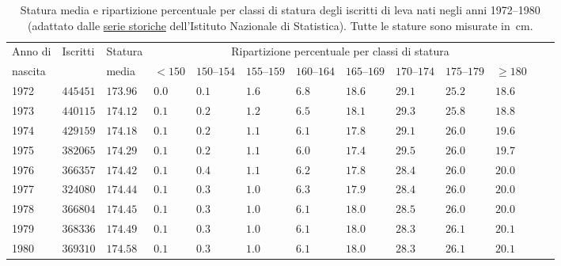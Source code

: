 \begin{table}[htb!]
  \begin{center}
  \begin{tabular}{lllllllllllll}
    \hline
    Anno di & Iscritti & Statura &
    \multicolumn{8}{c}{Ripartizione percentuale per classi di statura}\\
    \cline{4-11}%
    nascita & & media & \small$<150$ & \small$150$--$154$ &
    \small$155$--$159$ & \small$160$--$164$ & \small$165$--$169$ &
    \small$170$--$174$ & \small$175$--$179$ & \small$\geq 180$\\
    \hline
    \hline
    1972&$445451$&$173.96$&$0.0$&$0.1$&$1.6$&$6.8$&$18.6$&$29.1$&$25.2$&$18.6$\\
    1973&$440115$&$174.12$&$0.1$&$0.2$&$1.2$&$6.5$&$18.1$&$29.3$&$25.8$&$18.8$\\
    1974&$429159$&$174.18$&$0.1$&$0.2$&$1.1$&$6.1$&$17.8$&$29.1$&$26.0$&$19.6$\\
    1975&$382065$&$174.29$&$0.1$&$0.2$&$1.1$&$6.0$&$17.4$&$29.5$&$26.0$&$19.7$\\
    1976&$366357$&$174.42$&$0.1$&$0.4$&$1.1$&$6.2$&$17.8$&$28.4$&$26.0$&$20.0$\\
    1977&$324080$&$174.44$&$0.1$&$0.3$&$1.0$&$6.3$&$17.9$&$28.4$&$26.0$&$20.0$\\
    1978&$366804$&$174.45$&$0.1$&$0.3$&$1.0$&$6.1$&$18.0$&$28.5$&$26.0$&$20.0$\\
    1979&$368336$&$174.49$&$0.1$&$0.3$&$1.0$&$6.1$&$18.0$&$28.3$&$26.1$&$20.1$\\
    1980&$369310$&$174.58$&$0.1$&$0.3$&$1.0$&$6.1$&$18.0$&$28.3$&$26.1$&$20.1$\\
    \hline
  \end{tabular}
  \end{center}
  \caption{Statura media e ripartizione percentuale per classi di statura
    degli iscritti di leva nati negli anni 1972--1980 (adattato dalle
    \href{http://seriestoriche.istat.it/}{serie storiche} dell'Istituto
    Nazionale di Statistica). Tutte le stature sono misurate in~cm.}
  \label{tab:statura_leva}
\end{table}



